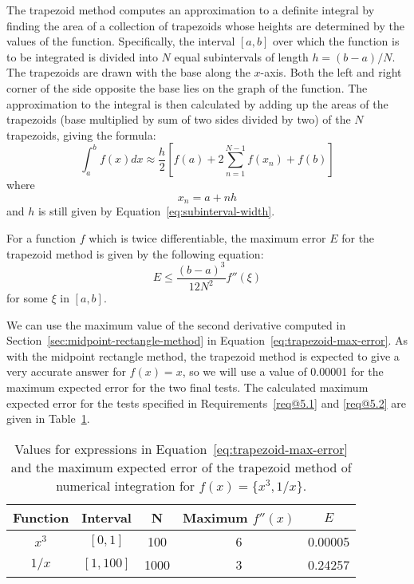 \label{Trapezoid_Integration}

The trapezoid method computes an approximation to a 
definite integral by finding the area of a collection of trapezoids whose heights are determined 
by the values of the function.  Specifically, the interval $[a,b]$ over which the function is to 
be integrated is divided into $N$ equal subintervals of length $h = (b-a)/N$. The trapezoids are 
drawn with the base along the $x$-axis.  Both the left and right corner of the side opposite the 
base lies on the graph of the function. The approximation to the integral is 
then calculated by adding up the areas of the trapezoids (base multiplied by sum of two sides 
divided by two) of the $N$ trapezoids, giving the formula:
\begin{equation}
  \int_a^b f(x) dx \approx \frac{h}{2} \left[ f(a) + 2\sum_{n=1}^{N-1} f(x_n) + f(b) \right] \label{eq:trapezoid}
\end{equation}
where 
\begin{equation}\label{eq:xn-trapezoid}
x_n = a + nh
\end{equation}
and $h$ is still given by Equation~\ref{eq:subinterval-width}.

For a function $f$ which is twice differentiable, the maximum error $E$ for the
trapezoid method is given by the following equation:
\begin{equation}
  E \leq \frac{(b-a)^3}{12 N^2} f''(\xi) \label{eq:trapezoid-max-error}
\end{equation}
for some $\xi$ in $[a,b]$.

We can use the maximum value of the second derivative 
computed in Section~\ref{sec:midpoint-rectangle-method} 
in Equation~\ref{eq:trapezoid-max-error}. 
As with the midpoint rectangle method, the trapezoid method is expected to give a very 
accurate answer for $f(x) = x$,
so we will use a value of 0.00001 for the maximum expected error for the two final tests.
The calculated maximum expected error for the tests specified in Requirements~\ref{req@5.1} and
\ref{req@5.2} are given in Table~\ref{tab:trapezoid-error}.

\begin{table}[htbp]
  \centering
  \caption{Values for expressions in Equation~\ref{eq:trapezoid-max-error} and the maximum 
    expected error of the trapezoid method of numerical integration for $f(x) = \{x^3, 1/x\}$.}
  \label{tab:trapezoid-error}
  \begin{tabular}{ccccc}
    \textbf{Function} & \textbf{Interval} & \textbf{N} & \textbf{Maximum $f''(x)$} & $E$  \\ \toprule
    $x^3$ & $[0,1]$   & 100  & 6 & 0.00005 \\ \midrule
    $1/x$ & $[1,100]$ & 1000 & 3 & 0.24257 \\ \bottomrule
  \end{tabular}
\end{table}

